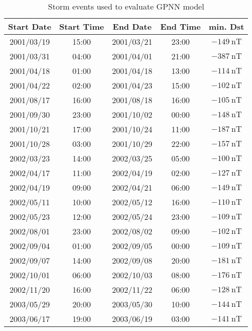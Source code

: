 \begin{table}[h]
	\fontsize{8}{9.6}\selectfont
	\centering
	\caption{Storm events used to evaluate GPNN model}
	\label{table:teststormsgpnn}
	\begin{tabular}{ccccc}
	\hline
	Start Date & Start Time & End Date & End Time & min. Dst \\ \hline
	2001/03/19 & 15:00 & 2001/03/21 & 23:00 & $ \SI{-149}{\nano\tesla}$ \\
	2001/03/31 & 04:00 & 2001/04/01 & 21:00 & $ \SI{-387}{\nano\tesla}$ \\
	2001/04/18 & 01:00 & 2001/04/18 & 13:00 & $ \SI{-114}{\nano\tesla}$ \\
	2001/04/22 & 02:00 & 2001/04/23 & 15:00 & $ \SI{-102}{\nano\tesla}$ \\
	2001/08/17 & 16:00 & 2001/08/18 & 16:00 & $ \SI{-105}{\nano\tesla}$ \\
	2001/09/30 & 23:00 & 2001/10/02 & 00:00 & $ \SI{-148}{\nano\tesla}$ \\
	2001/10/21 & 17:00 & 2001/10/24 & 11:00 & $ \SI{-187}{\nano\tesla}$ \\
	2001/10/28 & 03:00 & 2001/10/29 & 22:00 & $ \SI{-157}{\nano\tesla}$ \\
	2002/03/23 & 14:00 & 2002/03/25 & 05:00 & $ \SI{-100}{\nano\tesla}$ \\
	2002/04/17 & 11:00 & 2002/04/19 & 02:00 & $ \SI{-127}{\nano\tesla}$ \\
	2002/04/19 & 09:00 & 2002/04/21 & 06:00 & $ \SI{-149}{\nano\tesla}$ \\
	2002/05/11 & 10:00 & 2002/05/12 & 16:00 & $ \SI{-110}{\nano\tesla}$ \\
	2002/05/23 & 12:00 & 2002/05/24 & 23:00 & $ \SI{-109}{\nano\tesla}$ \\
	2002/08/01 & 23:00 & 2002/08/02 & 09:00 & $ \SI{-102}{\nano\tesla}$ \\
	2002/09/04 & 01:00 & 2002/09/05 & 00:00 & $ \SI{-109}{\nano\tesla}$ \\
	2002/09/07 & 14:00 & 2002/09/08 & 20:00 & $ \SI{-181}{\nano\tesla}$ \\
	2002/10/01 & 06:00 & 2002/10/03 & 08:00 & $ \SI{-176}{\nano\tesla}$ \\
	2002/11/20 & 16:00 & 2002/11/22 & 06:00 & $ \SI{-128}{\nano\tesla}$ \\
	2003/05/29 & 20:00 & 2003/05/30 & 10:00 & $ \SI{-144}{\nano\tesla}$ \\
	2003/06/17 & 19:00 & 2003/06/19 & 03:00 & $ \SI{-141}{\nano\tesla}$ \\

\end{tabular}
\end{table}
